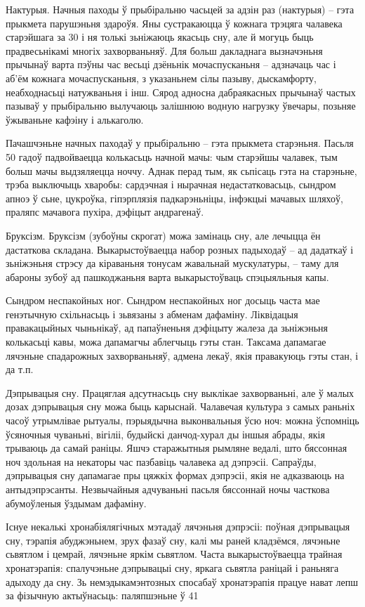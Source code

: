 Нактурыя. Начныя паходы ў прыбіральню часьцей за адзін раз (нактурыя) – гэта прыкмета парушэньня здароўя. Яны сустракаюцца ў кожнага трэцяга чалавека старэйшага за 30 і ня толькі зьніжаюць якасьць сну, але й могуць быць прадвесьнікамі многіх захворваньняў. Для больш дакладнага вызначэньня прычынаў варта пэўны час весьці дзёньнік мочаспусканьня – адзначаць час і аб'ём кожнага мочаспусканьня, з указаньнем сілы пазыву, дыскамфорту, неабходнасьці натужваньня і інш. Сярод адносна дабраякасных прычынаў частых пазываў у прыбіральню вылучаюць залішнюю водную нагрузку ўвечары, позьняе ўжываньне кафэіну і алькаголю.

Пачашчэньне начных паходаў у прыбіральню – гэта прыкмета старэньня. Пасьля 50 гадоў падвойваецца колькасьць начной мачы: чым старэйшы чалавек, тым больш мачы выдзяляецца ноччу. Аднак перад тым, як сьпісаць гэта на старэньне, трэба выключыць хваробы: сардэчная і нырачная недастатковасьць, сындром апноэ ў сьне, цукроўка, гіпэрплязія падкарэньніцы, інфэкцыі мачавых шляхоў, праляпс мачавога пухіра, дэфіцыт андрагенаў.

Бруксізм. Бруксізм (зубоўны скрогат) можа замінаць сну, але лечыцца ён дастаткова складана. Выкарыстоўваецца набор розных падыходаў – ад дадаткаў і зьніжэньня стрэсу да кіраваньня тонусам жавальнай мускулатуры, – таму для абароны зубоў ад пашкоджаньня варта выкарыстоўваць спэцыяльныя капы. 

Сындром неспакойных ног. Сындром неспакойных ног досыць часта мае генэтычную схільнасьць і зьвязаны з абменам дафаміну. Ліквідацыя правакацыйных чыньнікаў, ад папаўненьня дэфіцыту жалеза да зьніжэньня колькасьці кавы, можа дапамагчы аблегчыць гэты стан. Таксама дапамагае лячэньне спадарожных захворваньняў, адмена лекаў, якія правакуюць гэты стан, і да т.п.

Дэпрывацыя сну. Працяглая адсутнасьць сну выклікае захворваньні, але ў малых дозах дэпрывацыя сну можа быць карыснай. Чалавечая культура з самых раньніх часоў утрымлівае рытуалы, пэрыядычна выконвальныя ўсю ноч: можна ўспомніць ўсяночныя чуваньні, вігіліі, будыйскі данчод-хурал ды іншыя абрады, якія трываюць да самай раніцы. Яшчэ старажытныя рымляне ведалі, што бяссонная ноч здольная на некаторы час пазбавіць чалавека ад дэпрэсіі. Сапраўды, дэпрывацыя сну дапамагае пры цяжкіх формах дэпрэсіі, якія не адказваюць на антыдэпрэсанты. Незвычайныя адчуваньні пасьля бяссоннай ночы часткова абумоўленыя ўздымам дафаміну.

Існуе некалькі хронабіялягічных мэтадаў лячэньня дэпрэсіі: поўная дэпрывацыя сну, тэрапія абуджэньнем, зрух фазаў сну, калі мы раней кладзёмся, лячэньне сьвятлом і цемрай, лячэньне яркім сьвятлом. Часта выкарыстоўваецца трайная хронатэрапія: спалучэньне дэпрывацыі сну, яркага сьвятла раніцай і раньняга адыходу да сну. Зь немэдыкамэнтозных спосабаў хронатэрапія працуе нават лепш за фізычную актыўнасьць: паляпшэньне ў 41%

